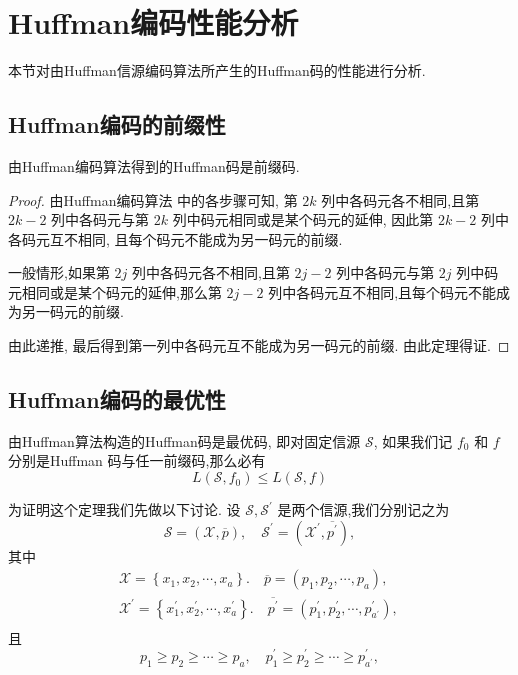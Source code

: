 \section{Huffman编码性能分析}

本节对由Huffman信源编码算法所产生的Huffman码的性能进行分析.

\subsection{ Huffman编码的前缀性}
\begin{theorem}[Huffman码的前缀性]
    由Huffman编码算法得到的Huffman码是前缀码.
\end{theorem}
\begin{proof}
     由Huffman编码算法  中的各步骤可知, 第 $ 2 k $ 列中各码元各不相同,且第 $ 2 k-2 $ 列中各码元与第 $ 2 k $ 列中码元相同或是某个码元的延伸, 因此第 $ 2 k-2 $ 列中各码元互不相同, 且每个码元不能成为另一码元的前缀.

一般情形,如果第 $ 2 j $ 列中各码元各不相同,且第 $ 2 j-2 $ 列中各码元与第 $ 2 j $ 列中码元相同或是某个码元的延伸,那么第 $ 2 j-2 $ 列中各码元互不相同,且每个码元不能成为另一码元的前缀.

由此递推, 最后得到第一列中各码元互不能成为另一码元的前缀. 由此定理得证.
\end{proof}

\subsection{Huffman编码的最优性}
\begin{theorem}[Huffman码的最优性定理]
    由Huffman算法构造的Huffman码是最优码, 即对固定信源 $ \mathscr{S} $, 如果我们记 $ f_{0} $ 和 $ f $ 分别是Huffman 码与任一前缀码,那么必有
$$
L\left(\mathscr{S}, f_{0}\right) \leq L(\mathscr{S}, f)
$$
\end{theorem}


为证明这个定理我们先做以下讨论. 设 $ \mathscr{S}, \mathscr{S}^{\prime} $ 是两个信源,我们分别记之为
$$
\mathscr{S}=(\mathscr{X}, \overline{p}), \quad \mathscr{S}^{\prime}=\left(\mathscr{X}^{\prime}, \overline{p^{\prime}}\right),
$$
其中
$$
\begin{array}{l}
\mathscr{X}=\left\{x_{1}, x_{2}, \cdots, x_{a}\right\} . \quad \overline{p}=\left(p_{1}, p_{2}, \cdots, p_{a}\right), \\
\mathscr{X}^{\prime}=\left\{x_{1}^{\prime}, x_{2}^{\prime}, \cdots, x_{a}^{\prime}\right\} . \quad \overline{p^{\prime}}=\left(p_{1}^{\prime}, p_{2}^{\prime}, \cdots, p_{a^{\prime}}^{\prime}\right) \text {, } \\
\end{array}
$$
且
$$
p_{1} \geq p_{2} \geq \cdots \geq p_{a}, \quad p_{1}^{\prime} \geq p_{2}^{\prime} \geq \cdots \geq p_{a^{\prime}}^{\prime},
$$

